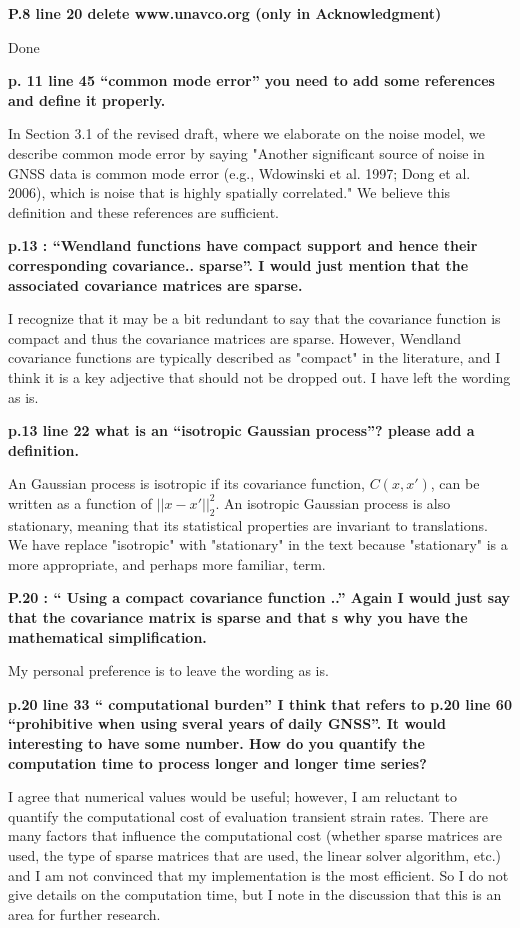 \documentclass[10pt,a4paper]{letter}
\begin{document}
\begin{letter}{}
\textbf{P.8 line 20 delete www.unavco.org (only in Acknowledgment)}

Done

\textbf{p. 11 line 45 “common mode error” you need to add some references and
define it properly.}

In Section 3.1 of the revised draft, where we elaborate on the noise
model, we describe common mode error by saying "Another significant
source of noise in GNSS data is common mode error (e.g., Wdowinski et
al. 1997; Dong et al. 2006), which is noise that is highly spatially
correlated." We believe this definition and these references are
sufficient.

\textbf{p.13 : “Wendland functions have compact support and hence their
corresponding covariance.. sparse”. I would just mention that the
associated covariance matrices are sparse.}

I recognize that it may be a bit redundant to say that the covariance
function is compact and thus the covariance matrices are sparse.
However, Wendland covariance functions are typically described as
"compact" in the literature, and I think it is a key adjective that
should not be dropped out. I have left the wording as is.

\textbf{p.13 line 22 what is an “isotropic Gaussian process”? please add a
definition.}

An Gaussian process is isotropic if its covariance function,
$C(x,x')$, can be written as a function of $||x - x'||_2^2$. An
isotropic Gaussian process is also stationary, meaning that its
statistical properties are invariant to translations. We have replace
"isotropic" with "stationary" in the text because "stationary" is a
more appropriate, and perhaps more familiar, term.

\textbf{P.20 : “ Using a compact covariance function ..” Again I would just
say that the covariance matrix is sparse and that s why you have the
mathematical simplification.}

My personal preference is to leave the wording as is.

\textbf{p.20 line 33 “ computational burden” I think that refers to p.20 line
60 “prohibitive when using sveral years of daily GNSS”. It would
interesting to have some number. How do you quantify the computation
time to process longer and longer time series?}

I agree that numerical values would be useful; however, I am reluctant
to quantify the computational cost of evaluation transient strain
rates. There are many factors that influence the computational cost
(whether sparse matrices are used, the type of sparse matrices that
are used, the linear solver algorithm, etc.) and I am not convinced
that my implementation is the most efficient. So I do not give details
on the computation time, but I note in the discussion that this is an
area for further research.


\end{letter}
\end{document}
